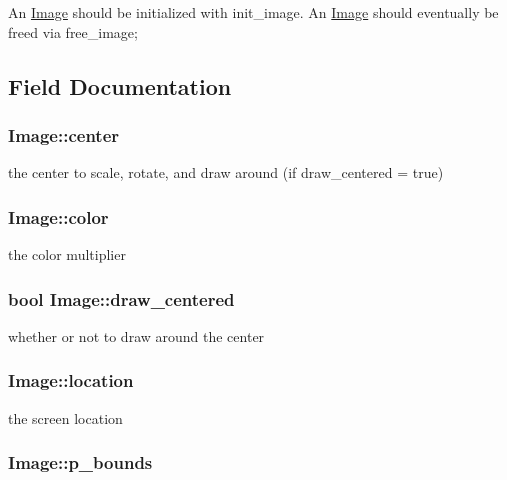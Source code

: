 An \hyperlink{struct_image}{Image} should be initialized with init\-\_\-image. An \hyperlink{struct_image}{Image} should eventually be freed via free\-\_\-image; 

\subsection{Field Documentation}
\hypertarget{struct_image_a533074775f8f6b07101b68a2a85fe617}{
\subsubsection[{center}]{ Image\-::center}}\label{struct_image_a533074775f8f6b07101b68a2a85fe617}
the center to scale, rotate, and draw around (if draw\-\_\-centered = true) \hypertarget{struct_image_a0d78100d523c9211a4f6c85bbd18d146}{
\subsubsection[{color}]{ Image\-::color}}\label{struct_image_a0d78100d523c9211a4f6c85bbd18d146}
the color multiplier \hypertarget{struct_image_a9338994b3f7570b780df3ec53ecad2c1}{
\subsubsection[{draw\-\_\-centered}]{\setlength{\rightskip}{0pt plus 5cm}bool Image\-::draw\-\_\-centered}}\label{struct_image_a9338994b3f7570b780df3ec53ecad2c1}
whether or not to draw around the center \hypertarget{struct_image_a3e80df7db427d8af97de2329f82da3fb}{
\subsubsection[{location}]{ Image\-::location}}\label{struct_image_a3e80df7db427d8af97de2329f82da3fb}
the screen location \hypertarget{struct_image_ade93faba09657b26b66db12a95c7a344}{
\subsubsection[{p\-\_\-bounds}]{ Image\-::p\-\_\-bounds}}\label{struct_image_ade93faba09657b26b66db12a95c7a344}
